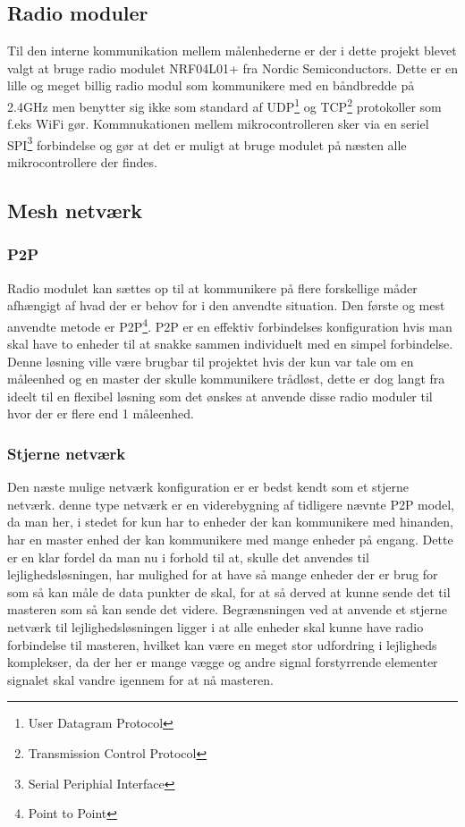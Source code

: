 \subsection{Radio moduler}
Til den interne kommunikation mellem målenhederne er der i dette projekt blevet valgt at bruge radio modulet NRF04L01+ fra Nordic Semiconductors.
\newline
Dette er en lille og meget billig radio modul som kommunikere med en båndbredde på 2.4GHz men benytter sig ikke som standard af UDP\footnote{User Datagram Protocol} og TCP\footnote{Transmission Control Protocol} protokoller som f.eks WiFi gør. 
Kommnukationen mellem mikrocontrolleren sker via en seriel SPI\footnote{Serial Periphial Interface} forbindelse og gør at det er muligt at bruge modulet på næsten alle mikrocontrollere der findes.

\subsection{Mesh netværk}
\subsubsection*{P2P}
Radio modulet kan sættes op til at kommunikere på flere forskellige måder afhængigt af hvad der er behov for i den anvendte situation.
Den første og mest anvendte metode er P2P\footnote{Point to Point}.
\newline
P2P er en effektiv forbindelses konfiguration hvis man skal have to enheder til at snakke sammen individuelt med en simpel forbindelse. Denne løsning ville være brugbar til projektet hvis der kun var tale om en måleenhed og en master der skulle kommunikere trådløst, dette er dog langt fra ideelt til en flexibel løsning som det ønskes at anvende disse radio moduler til hvor der er flere end 1 måleenhed.

\subsubsection*{Stjerne netværk}
Den næste mulige netværk konfiguration er er bedst kendt som et stjerne netværk. denne type netværk er en viderebygning af tidligere nævnte P2P model, da man her, i stedet for kun har to enheder der kan kommunikere med hinanden, har en master enhed der kan kommunikere med mange enheder på engang. Dette er en klar fordel da man nu i forhold til at, skulle det anvendes til lejlighedsløsningen, har mulighed for at have så mange enheder der er brug for som så kan måle de data punkter de skal, for at så derved at kunne sende det til masteren som så kan sende det videre.
\newline
Begrænsningen ved at anvende et stjerne netværk til lejlighedsløsningen ligger i at alle enheder skal kunne have radio forbindelse til masteren, hvilket kan være en meget stor udfordring i lejligheds komplekser, da der her er mange vægge og andre signal forstyrrende elementer signalet skal vandre igennem for at nå masteren.

